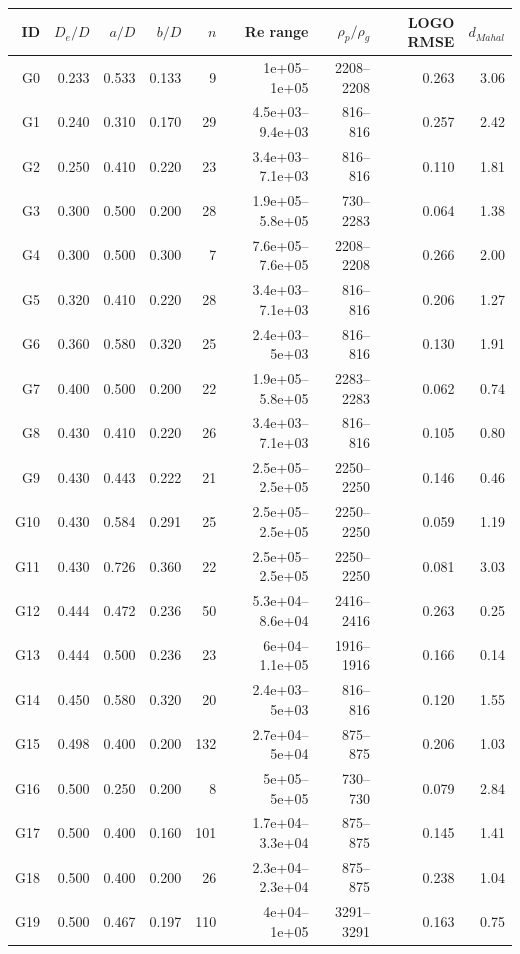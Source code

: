 {\scriptsize\begin{longtable}{rrrrrrrrr}\toprule ID & $D_e/D$ & $a/D$ & $b/D$ & $n$ & Re range & $\rho_p/\rho_g$ & LOGO RMSE & $d_{Mahal}$\\\midrule
G0 & 0.233 & 0.533 & 0.133 & 9 & 1e+05--1e+05 & 2208--2208 & 0.263 & 3.06\\
G1 & 0.240 & 0.310 & 0.170 & 29 & 4.5e+03--9.4e+03 & 816--816 & 0.257 & 2.42\\
G2 & 0.250 & 0.410 & 0.220 & 23 & 3.4e+03--7.1e+03 & 816--816 & 0.110 & 1.81\\
G3 & 0.300 & 0.500 & 0.200 & 28 & 1.9e+05--5.8e+05 & 730--2283 & 0.064 & 1.38\\
G4 & 0.300 & 0.500 & 0.300 & 7 & 7.6e+05--7.6e+05 & 2208--2208 & 0.266 & 2.00\\
G5 & 0.320 & 0.410 & 0.220 & 28 & 3.4e+03--7.1e+03 & 816--816 & 0.206 & 1.27\\
G6 & 0.360 & 0.580 & 0.320 & 25 & 2.4e+03--5e+03 & 816--816 & 0.130 & 1.91\\
G7 & 0.400 & 0.500 & 0.200 & 22 & 1.9e+05--5.8e+05 & 2283--2283 & 0.062 & 0.74\\
G8 & 0.430 & 0.410 & 0.220 & 26 & 3.4e+03--7.1e+03 & 816--816 & 0.105 & 0.80\\
G9 & 0.430 & 0.443 & 0.222 & 21 & 2.5e+05--2.5e+05 & 2250--2250 & 0.146 & 0.46\\
G10 & 0.430 & 0.584 & 0.291 & 25 & 2.5e+05--2.5e+05 & 2250--2250 & 0.059 & 1.19\\
G11 & 0.430 & 0.726 & 0.360 & 22 & 2.5e+05--2.5e+05 & 2250--2250 & 0.081 & 3.03\\
G12 & 0.444 & 0.472 & 0.236 & 50 & 5.3e+04--8.6e+04 & 2416--2416 & 0.263 & 0.25\\
G13 & 0.444 & 0.500 & 0.236 & 23 & 6e+04--1.1e+05 & 1916--1916 & 0.166 & 0.14\\
G14 & 0.450 & 0.580 & 0.320 & 20 & 2.4e+03--5e+03 & 816--816 & 0.120 & 1.55\\
G15 & 0.498 & 0.400 & 0.200 & 132 & 2.7e+04--5e+04 & 875--875 & 0.206 & 1.03\\
G16 & 0.500 & 0.250 & 0.200 & 8 & 5e+05--5e+05 & 730--730 & 0.079 & 2.84\\
G17 & 0.500 & 0.400 & 0.160 & 101 & 1.7e+04--3.3e+04 & 875--875 & 0.145 & 1.41\\
G18 & 0.500 & 0.400 & 0.200 & 26 & 2.3e+04--2.3e+04 & 875--875 & 0.238 & 1.04\\
G19 & 0.500 & 0.467 & 0.197 & 110 & 4e+04--1e+05 & 3291--3291 & 0.163 & 0.75\\

\end{longtable}}
